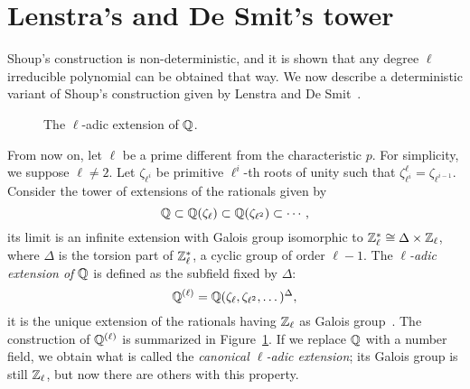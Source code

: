 \documentclass{sig-alternate}
\begin{document}

\section{Lenstra's and De Smit's tower}
\label{sec:LDtower}

Shoup's construction is non-deterministic, and it is shown that any
degree $\ell$ irreducible polynomial can be obtained that way. We now
describe a deterministic variant of Shoup's construction given by
Lenstra and De Smit~\cite{lenstra+desmit08-stdmodels}.

\begin{figure}
  \centering
  \caption{The $\ell$-adic extension of $\mathbb{Q}$.}
  \label{fig:ladic}
\end{figure}

From now on, let $\ell$ be a prime different from the characteristic
$p$. For simplicity, we suppose $\ell\ne2$. Let $\zeta_{\ell^i}$ be
primitive $\ell^i$-th roots of unity such that
$\zeta_{\ell^i}^\ell=\zeta_{\ell^{i-1}}$. Consider the tower of
extensions of the rationals given by
\begin{equation*}
  \mathbb{Q} \subset \mathbb{Q}(\zeta_\ell) \subset \mathbb{Q}(\zeta_{\ell^2}) \subset \cdots,
\end{equation*}
its limit is an infinite extension with Galois group isomorphic to
$\mathbb{Z}_\ell^\ast\cong\Delta\times\mathbb{Z}_\ell$, where $\Delta$ is the torsion
part of $\mathbb{Z}_\ell^\ast$, a cyclic group of order $\ell-1$. The
\emph{$\ell$-adic extension of $\mathbb{Q}$} is defined as the subfield fixed
by $\Delta$:
\begin{equation}
  \label{eq:}
  \mathbb{Q}^{(\ell)} = \mathbb{Q}(\zeta_\ell, \zeta_{\ell^2}, \dots)^\Delta,
\end{equation}
it is the unique extension of the rationals having $\mathbb{Z}_\ell$ as Galois
group~\cite{lang1990cyclotomic,washington1997introduction}. The
construction of $\mathbb{Q}^{(\ell)}$ is summarized in
Figure~\ref{fig:ladic}. If we replace $\mathbb{Q}$ with a number field, we
obtain what is called the \emph{canonical $\ell$-adic extension}; its
Galois group is still $\mathbb{Z}_\ell$, but now there are others with this
property.
\end{document}
